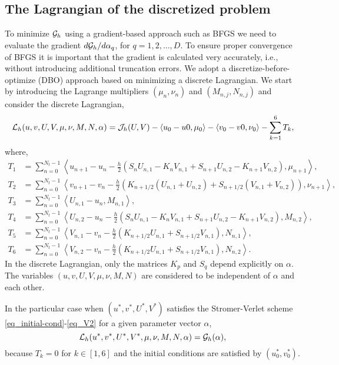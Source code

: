 \documentclass[11pt]{article}
\begin{document}
\subsection{The Lagrangian of the discretized problem}
To minimize ${\cal G}_h$ using a gradient-based approach such as BFGS we need to evaluate the gradient
$d {\cal G}_h/ d\alpha_q$, for $q=1,2,\ldots,D$. To ensure proper convergence of BFGS it is important that the
gradient is calculated very accurately, i.e., without introducing additional truncation errors. We
adopt a discretize-before-optimize (DBO) approach based on minimizing a discrete Lagrangian. We start by
introducing the Lagrange multipliers $(\mu_n,\nu_n)$ and $(M_{n,j}, N_{n,j})$ and consider the discrete Lagrangian,
\begin{equation}
{\cal L}_h(u,v,U,V, \mu,\nu,M,N,\alpha) = {\cal J}_h(U,V) - \langle u_0 - u0, \mu_0\rangle - \langle
v_0 - v0, \nu_0\rangle - \sum_{k=1}^6 T_k,
\end{equation}
where,
\begin{align}
T_1 &= \sum_{n=0}^{N_t-1} \left\langle u_{n+1} - u_n - \frac{h}{2}\left(S_nU_{n,1} - K_nV_{n,1} + S_{n+1}U_{n,2} - K_{n+1}V_{n,2}
  \right), \mu_{n+1} \right\rangle,\\
T_2 &= \sum_{n=0}^{N_t-1} \left\langle v_{n+1} - v_n - \frac{h}{2}\left(K_{n+1/2} \left(U_{n,1} + U_{n,2}\right) + S_{n+1/2}\left(
  V_{n,1} +  V_{n,2}\right) \right), \nu_{n+1} \right\rangle,\\
T_3 &= \sum_{n=0}^{N_t-1} \left\langle U_{n,1} - u_n, M_{n,1} \right\rangle,\\
T_4 &= \sum_{n=0}^{N_t-1} \left\langle U_{n,2} - u_n - \frac{h}{2}\left(S_nU_{n,1} - K_nV_{n,1} + S_{n+1}U_{n,2} -
  K_{n+1}V_{n,2} \right), M_{n,2} \right\rangle,\\
T_5 &= \sum_{n=0}^{N_t-1} \left\langle V_{n,1} - v_n - \frac{h}{2}\left(  K_{n+1/2} U_{n,1} + S_{n+1/2} V_{n,1} \right), N_{n,1} \right\rangle,\\
T_6 &= \sum_{n=0}^{N_t-1} \left\langle V_{n,2} - v_n - \frac{h}{2}\left(  K_{n+1/2} U_{n,1} + S_{n+1/2} V_{n,1} \right), N_{n,2} \right\rangle.
\end{align}
In the discrete Lagrangian, only the matrices $K_p$ and $S_q$ depend explicitly on $\alpha$. The
variables $(u,v,U,V, \mu,\nu,M,N)$ are considered to be independent of $\alpha$ and each
other.

In the particular case when $(u^*,v^*,U^*,V^*)$ satisfies the Stromer-Verlet scheme
\eqref{eq_initial-cond}-\eqref{eq_V2} for a given parameter vector $\alpha$,
\[
{\cal L}_h(u^*,v^*,U^*,V^*, \mu,\nu,M,N,\alpha) = {\cal G}_h(\alpha),
\]
because $T_k=0$ for $k\in[1,6]$ and the initial conditions are satisfied by $(u^*_0, v^*_0)$.
\end{document}
